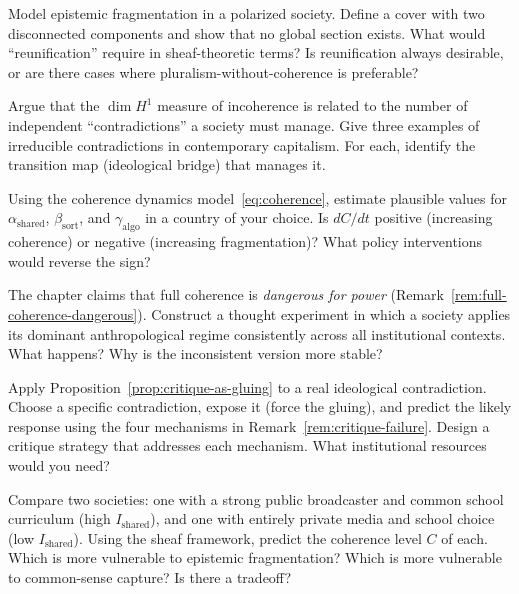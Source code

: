 \begin{exercise}
Model epistemic fragmentation in a polarized society.
Define a cover with two disconnected components and show that no global section exists.
What would ``reunification'' require in sheaf-theoretic terms?
Is reunification always desirable, or are there cases where pluralism-without-coherence is preferable?
\end{exercise}

\begin{exercise}
Argue that the $\dim H^1$ measure of incoherence is related to the number of independent ``contradictions'' a society must manage.
Give three examples of irreducible contradictions in contemporary capitalism.
For each, identify the transition map (ideological bridge) that manages it.
\end{exercise}

\begin{exercise}
\label{ex:ch12-coherence-dynamics}
Using the coherence dynamics model~\eqref{eq:coherence}, estimate plausible values for $\alpha_{\text{shared}}$, $\beta_{\text{sort}}$, and $\gamma_{\text{algo}}$ in a country of your choice.
Is $dC/dt$ positive (increasing coherence) or negative (increasing fragmentation)?
What policy interventions would reverse the sign?
\end{exercise}

\begin{exercise}
The chapter claims that full coherence is \emph{dangerous for power} (Remark~\ref{rem:full-coherence-dangerous}).
Construct a thought experiment in which a society applies its dominant anthropological regime consistently across all institutional contexts.
What happens?
Why is the inconsistent version more stable?
\end{exercise}

\begin{exercise}
\label{ex:ch12-critique}
Apply Proposition~\ref{prop:critique-as-gluing} to a real ideological contradiction.
Choose a specific contradiction, expose it (force the gluing), and predict the likely response using the four mechanisms in Remark~\ref{rem:critique-failure}.
Design a critique strategy that addresses each mechanism.
What institutional resources would you need?
\end{exercise}

\begin{exercise}
Compare two societies: one with a strong public broadcaster and common school curriculum (high $I_{\text{shared}}$), and one with entirely private media and school choice (low $I_{\text{shared}}$).
Using the sheaf framework, predict the coherence level $C$ of each.
Which is more vulnerable to epistemic fragmentation?
Which is more vulnerable to common-sense capture?
Is there a tradeoff?
\end{exercise}
